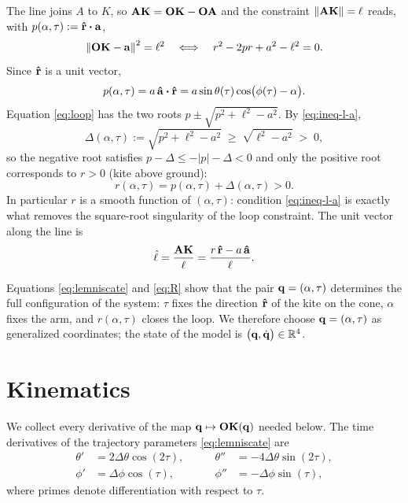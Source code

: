 \documentclass[10pt, a4paper]{article}
\begin{document}
The line joins $A$ to $K$, so $\vb{AK} = \vb{OK} - \vb{OA}$ and the constraint
$\norm{\vb{AK}} = \ell$ reads, with $p(\alpha, \tau) := \rhat \vdot \vb a$,
\begin{equation} \label{eq:loop}
    \norm{\vb{OK} - \vb a}^2 = \ell^2
    \quad\Longleftrightarrow\quad
    r^2 - 2pr + a^2 - \ell^2 = 0.
\end{equation}
Since $\vu r$ is a unit vector,
\begin{equation} \label{eq:p}
    p(\alpha, \tau)
    = a\,\ahat \vdot \rhat
    = a \sin\theta(\tau) \cos\bigl(\phi(\tau) - \alpha\bigr).
\end{equation}
Equation \eqref{eq:loop} has the two roots $p \pm \sqrt{p^2 + \ell^2 - a^2}$.
By \eqref{eq:ineq-l-a},
\begin{equation} \label{eq:Delta}
    \Delta(\alpha, \tau)
    := \sqrt{p^2 + \ell^2 - a^2}
    \;\ge\; \sqrt{\ell^2 - a^2}
    \;>\; 0,
\end{equation}
so the negative root satisfies $p - \Delta \le -\lvert p \rvert - \Delta < 0$
and only the positive root corresponds to $r > 0$ (kite above ground):
\begin{equation} \label{eq:R}
    r(\alpha, \tau) = p(\alpha, \tau) + \Delta(\alpha, \tau) > 0.
\end{equation}
In particular $r$ is a smooth function of $(\alpha, \tau)$: condition
\eqref{eq:ineq-l-a} is exactly what removes the square-root singularity of
the loop constraint.  The unit vector along the line is
\begin{equation} \label{eq:lhat}
    \hat \ell = \frac{\vb{AK}}{\ell}
    = \frac{r\,\vu r - a\,\vu a}{\ell}.
\end{equation}

Equations \eqref{eq:lemniscate} and \eqref{eq:R} show that the pair
$\vb q = (\alpha, \tau)$ determines the full configuration of the system:
$\tau$ fixes the direction $\vu r$ of the kite on the cone, $\alpha$ fixes
the arm, and $r(\alpha, \tau)$ closes the loop.  We therefore choose
$\vb q = (\alpha, \tau)$ as generalized coordinates; the state of the model is
$\bigl(\vb q, \dot{\vb q}\bigr) \in \mathbb{R}^4$.

\section{Kinematics}
\label{sec:kinematics}

We collect every derivative of the map $\vb q \mapsto \vb{OK}(\vb q)$ needed below.
The time derivatives of the trajectory parameters \eqref{eq:lemniscate} are
\begin{equation} \label{eq:theta-phi-derivatives}
    \begin{aligned}
        \theta' &= 2\Delta\theta \cos(2\tau),
        &\qquad \theta'' &= -4\Delta\theta \sin(2\tau),\\
        \phi' &= \Delta\phi \cos(\tau),
        &\qquad \phi'' &= -\Delta\phi \sin(\tau),
    \end{aligned}
\end{equation}
where primes denote differentiation with respect to $\tau$.
\end{document}
